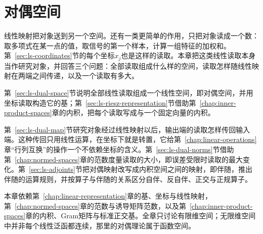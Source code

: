 \chapter{对偶空间}
\label{chap:dual-spaces}

线性映射把对象送到另一个空间。还有一类更简单的作用，只把对象读成一个数：取多项式在某一点的值，取信号的第一个样本，计算一组特征的加权和。第~\ref{sec:ls-coordinates}节的每个坐标$x_j$也是这样的读取。本章把这类线性读取本身当作研究对象，并回答三个问题：全部读取组成什么样的空间，读取怎样随线性映射在两端之间传递，以及一个读取有多大。

第~\ref{sec:ls-dual-space}节说明全部线性读取组成一个线性空间，即对偶空间，并用坐标读取构造它的基；第~\ref{sec:ls-riesz-representation}节借助第~\ref{chap:inner-product-spaces}章的内积，把每个读取写成与一个固定向量的内积。

第~\ref{sec:ls-dual-map}节研究对象经过线性映射以后，输出端的读取怎样传回输入端。这种传回只用线性运算，在坐标下就是转置，它给第~\ref{chap:linear-operations}章“行列互换”的操作一个不依赖坐标的含义。第~\ref{sec:ls-dual-norms}节借助第~\ref{chap:normed-spaces}章的范数度量读取的大小，即误差受限时读取的最大变化。第~\ref{sec:ls-adjoints}节把对偶映射改写成内积空间之间的映射，即伴随，推出伴随的运算规则，并按算子与伴随的关系区分自伴、反自伴、正交与正规算子。

本章依赖第~\ref{chap:linear-representation}章的基、坐标与线性映射，第~\ref{chap:normed-spaces}章的范数与诱导矩阵范数，以及第~\ref{chap:inner-product-spaces}章的内积、Gram矩阵与标准正交基。全章只讨论有限维空间；无限维空间中并非每个线性泛函都连续，那里的对偶理论属于函数空间。







